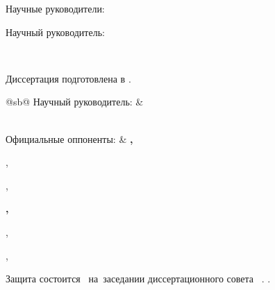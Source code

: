 %
\vspace{0pt plus4fill} %
\begin{flushright}
\ifdefined\supervisorTwoFio
Научные руководители:

\supervisorRegalia

\ifdefined\supervisorDead
\framebox{\supervisorFio}
\else
\supervisorFio
\fi

\supervisorTwoRegalia

\ifdefined\supervisorTwoDead
\framebox{\supervisorTwoFio}
\else
\supervisorTwoFio
\fi
\else
Научный руководитель:

\supervisorRegalia

\ifdefined\supervisorDead
\framebox{\supervisorFio}
\else
\supervisorFio
\fi
\fi

\end{flushright}
%
\vspace{0pt plus4fill} %
{\centering\thesisCity\ \thesisYear\par}

\clearpage

\thispagestyle{empty}
\noindent Диссертация подготовлена в {\thesisInOrganization}.

\vspace{0.008\paperheight plus1fill}
\noindent%
\begin{tabularx}{\textwidth}{@{}sb@{}}
	Научный руководитель:   & \supervisorRegalia\par
	\textbf{\supervisorFio}
	\vspace{0.013\paperheight}\\

	Официальные оппоненты:  &
		\textbf{\opponentOneFio,}\par
		\opponentOneRegalia,\par
		\opponentOneJobPlace,\par
		\opponentOneJobPost\par
		\vspace{0.01\paperheight}
		\textbf{\opponentTwoFio,}\par
		\opponentTwoRegalia,\par
		\opponentTwoJobPlace,\par
		\opponentTwoJobPost
\end{tabularx}

\vspace{0.008\paperheight plus1fill}
\noindent Защита состоится ~на~заседании диссертационного совета \ . .

